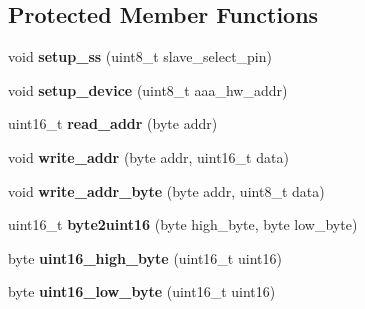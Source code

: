 \subsection*{Protected Member Functions}
\begin{DoxyCompactItemize}
\item 
\hypertarget{classMCP23S17_adc533f57a1c273a561ba8c43ef16583b}{void {\bfseries setup\-\_\-ss} (uint8\-\_\-t slave\-\_\-select\-\_\-pin)}\label{classMCP23S17_adc533f57a1c273a561ba8c43ef16583b}

\item 
\hypertarget{classMCP23S17_abfe8b764df74c1cd67d6f80abed9779a}{void {\bfseries setup\-\_\-device} (uint8\-\_\-t aaa\-\_\-hw\-\_\-addr)}\label{classMCP23S17_abfe8b764df74c1cd67d6f80abed9779a}

\item 
\hypertarget{classMCP23S17_acca0ab791c54a6ac93d1b54c94418ab5}{uint16\-\_\-t {\bfseries read\-\_\-addr} (byte addr)}\label{classMCP23S17_acca0ab791c54a6ac93d1b54c94418ab5}

\item 
\hypertarget{classMCP23S17_a318f98c1869e89485dcf3d2e1d994733}{void {\bfseries write\-\_\-addr} (byte addr, uint16\-\_\-t data)}\label{classMCP23S17_a318f98c1869e89485dcf3d2e1d994733}

\item 
\hypertarget{classMCP23S17_a7d9564ada8cedac7b6af214f79d172f2}{void {\bfseries write\-\_\-addr\-\_\-byte} (byte addr, uint8\-\_\-t data)}\label{classMCP23S17_a7d9564ada8cedac7b6af214f79d172f2}

\item 
\hypertarget{classMCP23S17_a6a6994827805f68850486de7ddd8ff56}{uint16\-\_\-t {\bfseries byte2uint16} (byte high\-\_\-byte, byte low\-\_\-byte)}\label{classMCP23S17_a6a6994827805f68850486de7ddd8ff56}

\item 
\hypertarget{classMCP23S17_a14ae844e7dac5033a13ce67cadb21864}{byte {\bfseries uint16\-\_\-high\-\_\-byte} (uint16\-\_\-t uint16)}\label{classMCP23S17_a14ae844e7dac5033a13ce67cadb21864}

\item 
\hypertarget{classMCP23S17_a5cf7aba638399ec9b4883079ae44dc35}{byte {\bfseries uint16\-\_\-low\-\_\-byte} (uint16\-\_\-t uint16)}\label{classMCP23S17_a5cf7aba638399ec9b4883079ae44dc35}

\end{DoxyCompactItemize}
